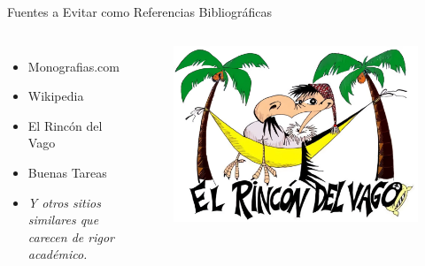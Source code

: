 \documentclass[
11pt, %
]{beamer}
\begin{document}
\begin{frame}{Fuentes a Evitar como Referencias Bibliográficas}

	\begin{columns}
		\begin{itemize}
			\item Monografias.com
			\item Wikipedia
			\item El Rincón del Vago
			\item Buenas Tareas
			\item \emph{Y otros sitios similares que carecen de rigor académico.}
		\end{itemize}
		\begin{figure}[H]
			\centering
			\includegraphics[width=1\linewidth]{images/image06}
		\end{figure}
	\end{columns}

\end{frame}
\end{document}
